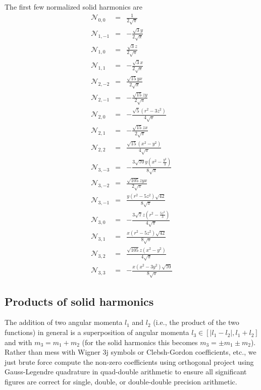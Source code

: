 \documentclass[12pt]{article}
\newcommand{\N}{\mathcal{N}}
\begin{document}
The first few normalized solid harmonics are
\begin{eqnarray}
\N_{0, 0} & = &  \frac{1}{2 \sqrt{\pi}}  \nonumber \\
\N_{1, -1} & = &  -\frac{\sqrt{3} y}{2 \sqrt{\pi}} \nonumber \\
\N_{1, 0} & = &  \frac{\sqrt{3} z}{2 \sqrt{\pi}} \nonumber \\
\N_{1, 1} & = &  -\frac{\sqrt{3} x}{2 \sqrt{\pi}} \nonumber \\
\N_{2, -2} & = &  \frac{\sqrt{15} y x}{2 \sqrt{\pi}} \nonumber \\
\N_{2, -1} & = &  -\frac{\sqrt{15} z y}{2 \sqrt{\pi}} \nonumber \\
\N_{2, 0} & = &  -\frac{\sqrt{5} \left(r^{2}-3 z^{2}\right)}{4 \sqrt{\pi}} \nonumber \\
\N_{2, 1} & = &  -\frac{\sqrt{15} z x}{2 \sqrt{\pi}} \nonumber \\
\N_{2, 2} & = &  \frac{\sqrt{15} \left(x^{2}-y^{2}\right)}{4 \sqrt{\pi}} \nonumber \\
\N_{3, -3} & = &  -\frac{3 \sqrt{70} y \left(x^{2}-\frac{y^{2}}{3}\right)}{8 \sqrt{\pi}} \nonumber \\
\N_{3, -2} & = &  \frac{\sqrt{105} z y x}{2 \sqrt{\pi}} \nonumber \\
\N_{3, -1} & = &  \frac{y \left(r^{2}-5 z^{2}\right) \sqrt{42}}{8 \sqrt{\pi}} \nonumber \\
\N_{3, 0} & = &  -\frac{3 \sqrt{7} z \left(r^{2}-\frac{5 z^{2}}{3}\right)}{4 \sqrt{\pi}}  \nonumber \\
\N_{3, 1} & = &  \frac{x \left(r^{2}-5 z^{2}\right) \sqrt{42}}{8 \sqrt{\pi}} \nonumber \\
\N_{3, 2} & = &  \frac{\sqrt{105} z \left(x^{2}-y^{2}\right)}{4 \sqrt{\pi}} \nonumber \\
\N_{3, 3} & = &  -\frac{x \left(x^{2}-3 y^{2}\right) \sqrt{70}}{8 \sqrt{\pi}} \nonumber
\end{eqnarray}

\subsection{Products of solid harmonics}

The addition of two angular momenta $l_1$ and $l_2$ (i.e., the product of the two functions) in general is a superposition of angular momenta $l_3 \in [|l_1-l_2|,l_1+l_2]$ and with $m_3 = m_1 + m_2$ (for the solid harmonics this becomes $m_3 = \pm m_1 \pm m_2$).  Rather than mess with Wigner 3j symbols or Clebsh-Gordon coefficients, etc., we just brute force compute the non-zero coefficients using orthogonal project using Gauss-Legendre quadrature in quad-double arithmetic to ensure all significant figures are correct for single, double, or double-double precision arithmetic.
\end{document}
